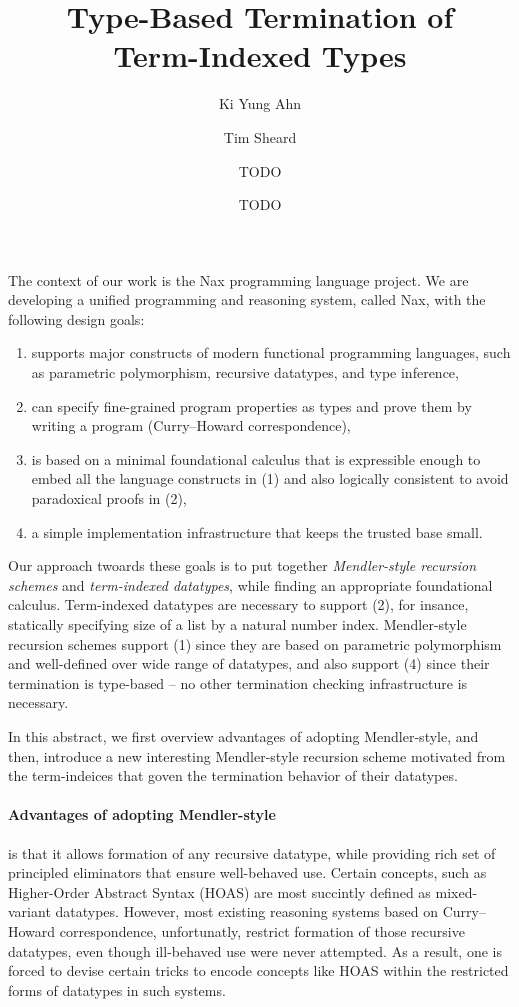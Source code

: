 \documentclass[a4paper]{easychair} %
\title{Type-Based Termination of\\ Term-Indexed Types}
\author{
Ki Yung Ahn\inst{1}
\and
Tim Sheard\inst{1}
 \and
TODO\inst{2}
 \and
TODO\inst{2}
}
\institute{
  Portland State University,\thanks{Funded by XXX project.} \\
  Portland, OR, USA
\and
  University of Cambridge, \\
  Cambridge, UK
}
\begin{document}
\maketitle


The context of our work is the Nax programming language project.
We are developing a unified programming and reasoning system,
called Nax, with the following design goals:\vspace*{-1ex}
\begin{enumerate}[(1)]
 \item supports major constructs of modern functional programming languages,
 such as parametric polymorphism, recursive datatypes, and type inference,
 \vspace*{-1.2ex}
 \item can specify fine-grained program properties as types and
 prove them by writing a program (Curry--Howard correspondence),
 \vspace*{-1.2ex}
 \item is based on a minimal foundational calculus
 that is expressible enough to embed all the language constructs in (1)
 and also logically consistent to avoid paradoxical proofs in (2),
 \vspace*{-1.2ex}
 \item a simple implementation infrastructure that keeps the trusted base small.
\end{enumerate}
Our approach twoards these goals is to put together
\emph{Mendler-style recursion schemes}
and \emph{term-indexed datatypes},
while finding an appropriate foundational calculus.
Term-indexed datatypes are necessary to support (2), for insance,
statically specifying size of a list by a natural number index.
Mendler-style recursion schemes support (1) since they are based
on parametric polymorphism and well-defined over wide range of datatypes,
and also support (4) since their termination is type-based --
no other termination checking infrastructure is necessary.

In this abstract, we first overview advantages of adopting Mendler-style,
and then, introduce a new interesting Mendler-style recursion scheme
motivated from the term-indeices that goven the termination
behavior of their datatypes.
\vspace*{-.5ex}
\paragraph{Advantages of adopting Mendler-style\!\!\!}
is that it allows formation of
any recursive datatype, while providing rich set of
principled eliminators that ensure well-behaved use.
Certain concepts, such as Higher-Order Abstract Syntax
(HOAS) are most succintly defined as mixed-variant datatypes.
However, most existing reasoning systems based on
Curry--Howard correspondence, unfortunatly, restrict
formation of those recursive datatypes, even though ill-behaved
use were never attempted. As a result, one is forced to devise
certain tricks to encode concepts like HOAS within the restricted
forms of datatypes in such systems.
\end{document}
